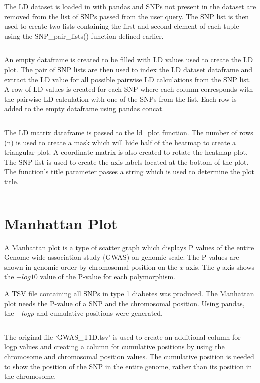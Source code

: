 \documentclass[12pt,a4paper]{article}
\newcommand{\mintfile}[1]{
\begin{tcolorbox}[colback=gray!5!white,%
	grow to left by=20mm,
    grow to right by=20mm,
    sharp corners]{{    \small \inputminted[breaklines]{python}{#1}		}}
\end{tcolorbox}}
\newcommand{\sect}[1]{
\FloatBarrier %
\hypertarget{#1}{
\section{#1}\label{#1}}
}
\begin{document}
The LD dataset is loaded in with pandas and SNPs not present in the dataset are removed from the list of SNPs passed from the user query. The SNP list is then used to create two lists containing the first and second element of each tuple using the SNP\_pair\_lists() function defined earlier.
\mintfile{code_snippets/placeholder.py}

An empty dataframe is created to be filled with LD values used to create the LD plot. The pair of SNP lists are then used to index the LD dataset dataframe and extract the LD value for all possible pairwise LD calculations from the SNP list. A row of LD values is created for each SNP where each column corresponds with the pairwise LD calculation with one of the SNPs from the list. Each row is added to the empty dataframe using pandas concat.
\mintfile{code_snippets/placeholder.py}

The LD matrix dataframe is passed to the ld\_plot function. The number of rows (n) is used to create a mask which will hide half of the heatmap to create a triangular plot. A coordinate matrix is also created to rotate the heatmap plot. The SNP list is used to create the axis labels located at the bottom of the plot. The function’s title parameter passes a string which is used to determine the plot title.
\mintfile{code_snippets/placeholder.py}

\sect{Manhattan Plot}

A Manhattan plot is a type of scatter graph which displays P values of the entire Genome-wide association study (GWAS) on genomic scale. The P-values are shown in genomic order by chromosomal position on the $x$-axis. The $y$-axis shows the $-log10$ value of the P-value for each polymorphism.

A TSV file containing all SNPs in type 1 diabetes was produced. The Manhattan plot needs the P-value of a SNP and the chromosomal position. Using pandas, the $-logp$ and cumulative positions were generated.

\mintfile{code_snippets/manPlot/createTSV.py}
The original file `GWAS\_T1D.tsv’ is used to create an additional column for -logp values and creating a column for cumulative positions by using the chromosome and chromosomal position values.
The cumulative position is needed to show the position of the SNP in the entire genome, rather than its position in the chromosome.
\end{document}
